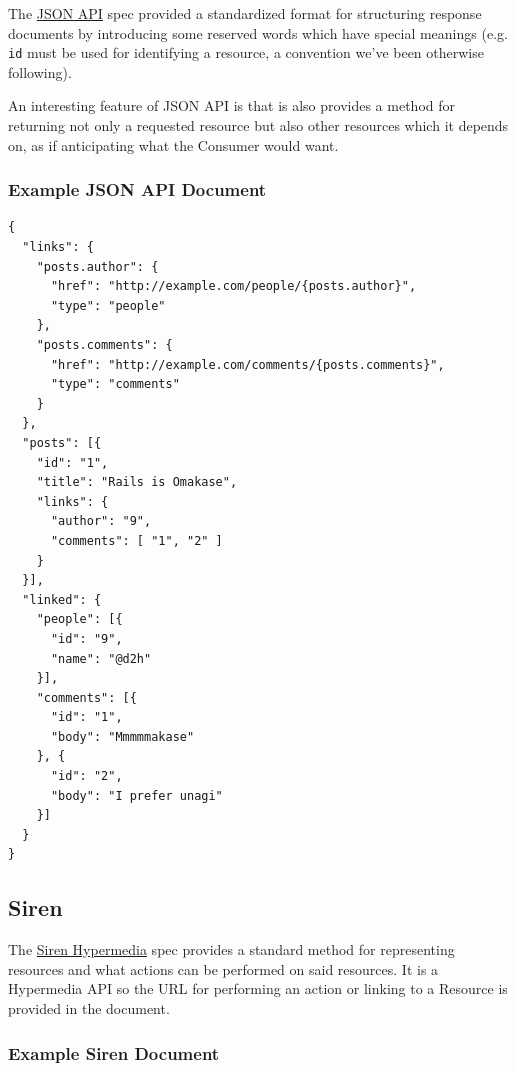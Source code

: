 \documentclass{book}
\begin{document}
The \href{http://jsonapi.org/}{JSON API} \cite{JSONAPI} spec provided a standardized format for structuring response documents by introducing some reserved words which have special meanings (e.g. \texttt{id} must be used for identifying a resource, a convention we've been otherwise following).

An interesting feature of JSON API is that is also provides a method for returning not only a requested resource but also other resources which it depends on, as if anticipating what the Consumer would want.

\subsubsection{Example JSON API Document}

\begin{verbatim}
{
  "links": {
    "posts.author": {
      "href": "http://example.com/people/{posts.author}",
      "type": "people"
    },
    "posts.comments": {
      "href": "http://example.com/comments/{posts.comments}",
      "type": "comments"
    }
  },
  "posts": [{
    "id": "1",
    "title": "Rails is Omakase",
    "links": {
      "author": "9",
      "comments": [ "1", "2" ]
    }
  }],
  "linked": {
    "people": [{
      "id": "9",
      "name": "@d2h"
    }],
    "comments": [{
      "id": "1",
      "body": "Mmmmmakase"
    }, {
      "id": "2",
      "body": "I prefer unagi"
    }]
  }
}
\end{verbatim}

\subsection{Siren}

The \href{http://sirenspec.org}{Siren Hypermedia} \cite{SIREN} spec provides a standard method for representing resources and what actions can be performed on said resources. It is a Hypermedia API so the URL for performing an action or linking to a Resource is provided in the document.

\subsubsection{Example Siren Document}
\end{document}
